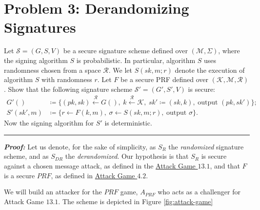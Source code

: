 \section{Problem 3: Derandomizing Signatures}\label{sec:problem3}

Let $\mathcal{S} = (G, S, V)$ be a secure signature scheme defined over $(\mathcal{M}, \Sigma)$, where the signing algorithm $S$ is probabilistic.
In particular, algorithm $S$ uses randomness chosen from a space $\mathcal{R}$.
We let $S(sk,m;r)$ denote the execution of algorithm $S$ with randomness $r$.
Let $F$ be a secure PRF defined over $(\mathcal{K}, \mathcal{M}, \mathcal{R})$.
Show that the following signature scheme $\mathcal{S'} = (G', S', V)$ is secure:
\begin{equation*}
    \begin{split}
        G'() &\coloneqq \{ (pk, sk) \overset{\mathcal{R}}{\longleftarrow} G(), 
            \hspace{3pt} k \overset{\mathcal{R}}{\longleftarrow} \mathcal{K}, 
            \hspace{3pt} sk' \coloneqq (sk, k), 
            \hspace{3pt} \text{output } (pk, sk') \}; \\
        S'(sk', m) &\coloneqq \{ r \longleftarrow F(k, m),
            \hspace{3pt} \sigma \longleftarrow S(sk, m; r),
            \hspace{3pt} \text{output } \sigma \}.
    \end{split}
\end{equation*}
Now the signing algorithm for $S'$ is deterministic.

\begin{center}
    \rule{5cm}{0.4pt}
\end{center}

\textbf{\textit{Proof:}}
Let us denote, for the sake of simplicity, as $S_{R}$ the \textit{randomized} signature scheme, and as $S_{DR}$ the \textit{derandomized}.
Our hypothesis is that $S_R$ is secure against a chosen message attack, as defined in the \hyperref[ag:13-1]{Attack Game $13.1$}, and that $F$ is a secure $PRF$, as defined in \hyperref[ag:4-2]{Attack Game $4.2$}.

We will build an attacker for the $PRF$ game, $A_{PRF}$ who acts as a challenger for Attack Game $13.1$.
The scheme is depicted in Figure \ref{fig:attack-game}

